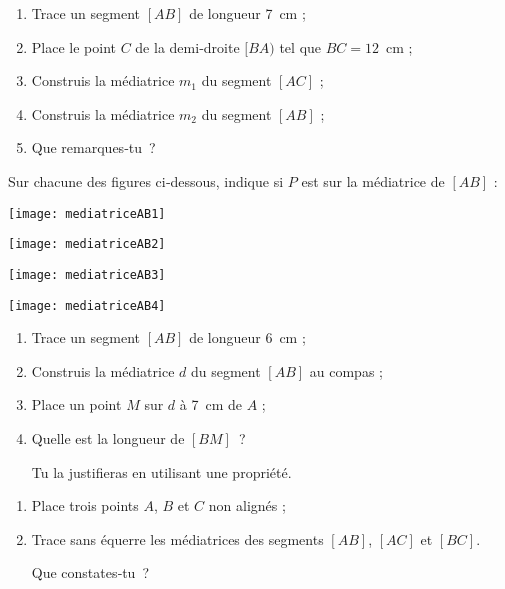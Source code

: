 \begin{exercice}
 \begin{enumerate}
  \item Trace un segment $[AB]$ de longueur 7 cm ;
  \item Place le point $C$ de la demi‑droite $[BA)$ tel que $BC = 12$ cm ;
  \item Construis la médiatrice $m_1$ du segment $[AC]$ ;
  \item Construis la médiatrice $m_2$ du segment $[AB]$ ;
  \item Que remarques‑tu ?
  \end{enumerate}
\end{exercice}


\begin{exercice}[Reconnaître]
Sur chacune des figures ci‑dessous, indique si $P$ est sur la médiatrice de $[AB]$ : \\[0.5em]
 \begin{colenumerate}{2}
  \item 
  
  \texttt{[image: mediatriceAB1]}
  \item 
  
  \texttt{[image: mediatriceAB2]}
  \item 
  
  \texttt{[image: mediatriceAB3]}
  \item 
  
  \texttt{[image: mediatriceAB4]}
  \end{colenumerate}
\end{exercice}
 
 
\begin{exercice}[Construction]
 \begin{enumerate}
 \item Trace un segment $[AB]$ de longueur 6 cm ;
 \item Construis la médiatrice $d$ du segment $[AB]$ au compas ;
 \item Place un point $M$ sur $d$ à 7 cm de $A$ ;
 \item Quelle est la longueur de $[BM]$ ? 
 
Tu la justifieras en utilisant une propriété.
  \end{enumerate}
\end{exercice}


\begin{exercice}
 \begin{enumerate}
 \item Place trois points $A$, $B$ et $C$ non alignés ;
 \item Trace sans équerre les médiatrices des segments $[AB]$, $[AC]$ et $[BC]$. 
 
 Que constates‑tu ?
 \end{enumerate}
\end{exercice}


